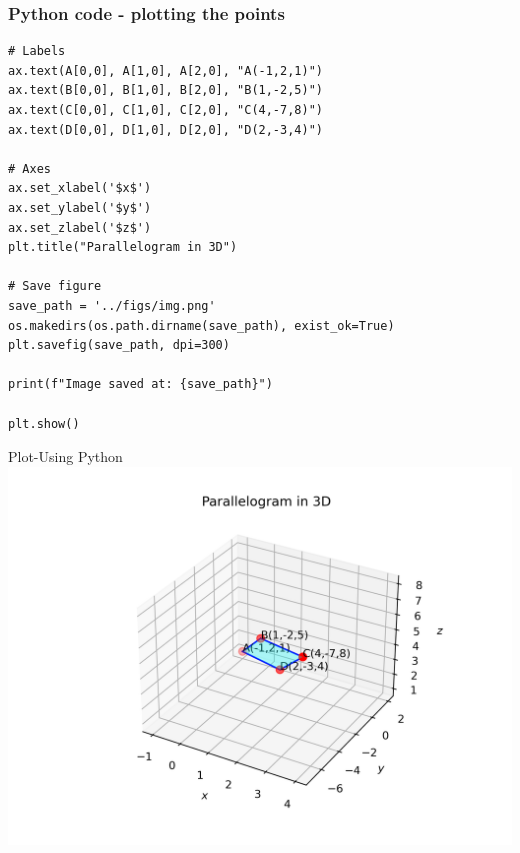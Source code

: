 \documentclass{beamer}
\begin{document}
\begin{frame}[fragile]                              
	\frametitle{Python code - plotting the points}
	\begin{lstlisting}
# Labels
ax.text(A[0,0], A[1,0], A[2,0], "A(-1,2,1)")
ax.text(B[0,0], B[1,0], B[2,0], "B(1,-2,5)")
ax.text(C[0,0], C[1,0], C[2,0], "C(4,-7,8)")
ax.text(D[0,0], D[1,0], D[2,0], "D(2,-3,4)")

# Axes
ax.set_xlabel('$x$')
ax.set_ylabel('$y$')
ax.set_zlabel('$z$')
plt.title("Parallelogram in 3D")

# Save figure
save_path = '../figs/img.png'
os.makedirs(os.path.dirname(save_path), exist_ok=True)
plt.savefig(save_path, dpi=300)

print(f"Image saved at: {save_path}")

plt.show()
\end{lstlisting}                               
\end{frame}

\begin{frame}{Plot-Using  Python}
    \centering
    \includegraphics[width=\columnwidth, height=0.8\textheight, keepaspectratio]{../figs/img.png}     
\end{frame}
\end{document}
